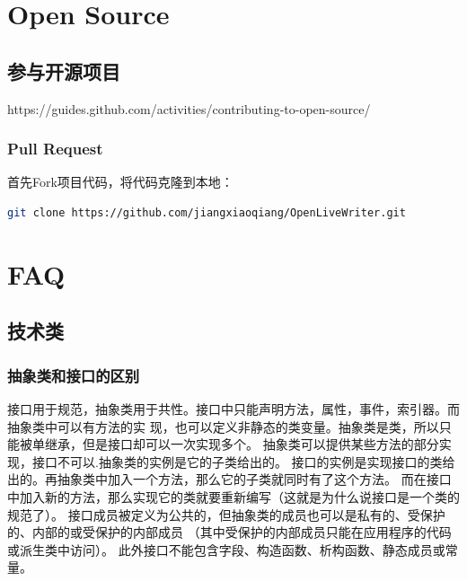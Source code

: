 \documentclass{book}
\begin{document}
\chapter{Open Source}

\section{参与开源项目}

https://guides.github.com/activities/contributing-to-open-source/

\subsection{Pull Request}

首先Fork项目代码，将代码克隆到本地：

\begin{lstlisting}[language=Bash]
git clone https://github.com/jiangxiaoqiang/OpenLiveWriter.git
\end{lstlisting}

\chapter{FAQ}

\clearpage

\section{技术类}

\subsection{抽象类和接口的区别}

接口用于规范，抽象类用于共性。接口中只能声明方法，属性，事件，索引器。而抽象类中可以有方法的实
现，也可以定义非静态的类变量。抽象类是类，所以只能被单继承，但是接口却可以一次实现多个。
抽象类可以提供某些方法的部分实现，接口不可以.抽象类的实例是它的子类给出的。
接口的实例是实现接口的类给出的。再抽象类中加入一个方法，那么它的子类就同时有了这个方法。
而在接口中加入新的方法，那么实现它的类就要重新编写（这就是为什么说接口是一个类的规范了）。
接口成员被定义为公共的，但抽象类的成员也可以是私有的、受保护的、内部的或受保护的内部成员
（其中受保护的内部成员只能在应用程序的代码或派生类中访问）。
此外接口不能包含字段、构造函数、析构函数、静态成员或常量。 
\end{document}
